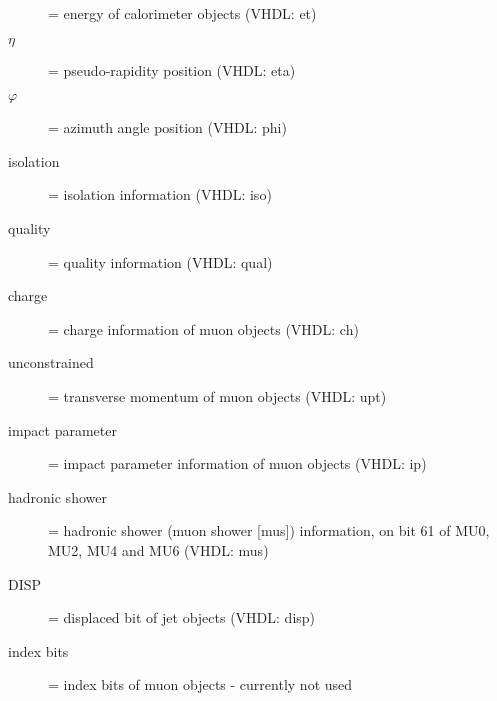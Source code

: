 \begin{description}
\item [{\et}] = energy of calorimeter objects (VHDL: et)
\item [{$\eta$}] = pseudo-rapidity position (VHDL: eta)
\item [{$\varphi$}] = azimuth angle position (VHDL: phi)
\item [{isolation}] = isolation information (VHDL: iso)
\item [{quality}] = quality information (VHDL: qual)
\item [{charge}] = charge information of muon objects (VHDL: ch)
\item [{unconstrained \pt}] = transverse momentum of muon objects (VHDL: upt)
\item [{impact parameter}] = impact parameter information of muon objects (VHDL: ip)
\item [{hadronic shower}] = hadronic shower (muon shower [mus]) information, on bit 61 of MU0, MU2, MU4 and MU6 (VHDL: mus)
\item [{DISP}] = displaced bit of jet objects (VHDL: disp)
\item [{index bits}] = index bits of muon objects - currently not used
\end{description}

\clearpage
